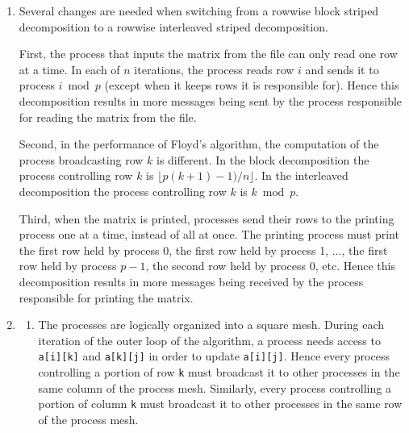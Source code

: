 \begin{enumerate}
      During iteration $k$ of Floyd's algorithm,
      the process controlling column $k$ must
      broadcast this column to the other processes.
      No other communications are needed to perform the computation.

      In order to print the matrix, one process should be responsible for
      all of the printing. Each row is gathered onto the one process
      that prints the row before moving on to print the next row.

\item Several changes are needed when switching from a rowwise block
      striped decomposition to a rowwise interleaved striped decomposition.

      First, the process that inputs the matrix from the file can only
      read one row at a time. In each of $n$ iterations, the process reads
      row $i$ and sends it to process $i \bmod p$ (except when it keeps rows
      it is responsible for).
      Hence this decomposition results in more messages being sent by the
      process responsible for reading the matrix from the file.

      Second, in the
      performance of Floyd's algorithm, the computation of the process
      broadcasting row $k$ is different. 
      In the block decomposition the process controlling row $k$ is
      $\lfloor p(k+1)-1)/n\rfloor$.
      In the interleaved decomposition the process controlling row $k$ is
      $k \bmod p$.

      Third, when the matrix is printed, processes send their rows to
      the printing process one at a time, instead of all at once.
      The printing process must print the first row held by process 0,
      the first row held by process 1, $\ldots$, the first row held by process
      $p-1$, the second row held by process 0, etc.
      Hence this decomposition results in more messages being received by
      the process responsible for printing the matrix.

\item \begin{enumerate}
      \item The processes are logically organized into a square mesh.
            During each iteration of the outer loop of the algorithm,
            a process needs access to {\tt a[i][k]} and {\tt a[k][j]} in order
            to update {\tt a[i][j]}.
            Hence every process controlling a portion of row {\tt k} must
            broadcast it to other processes in the same column of the process
            mesh.  Similarly, every process controlling a portion of
            column {\tt k} must broadcast it to other processes in the same
            row of the process mesh.


\end{enumerate}
\end{enumerate}
